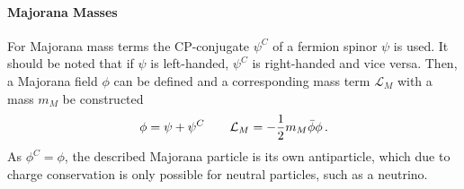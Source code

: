 \paragraph{Majorana Masses}
For Majorana mass terms the CP-conjugate $\psi^C$ of a fermion spinor $\psi$ is used. It should be noted that if $\psi$ is left-handed, $\psi^C$ is right-handed and vice versa. Then, a Majorana field $\phi$ can be defined and a corresponding mass term $\mathcal{L}_M$ with a mass $m_M$ be constructed~\cite{zuber2011neutrino}
\begin{equation}
\phi = \psi + \psi^C \qquad \mathcal{L}_M = -\frac{1}{2}m_M \bar\phi \phi \text{\,.}
\end{equation}
As $\phi^C=\phi$, the described Majorana particle is its own antiparticle, which due to charge conservation is only possible for neutral particles, such as a neutrino.

